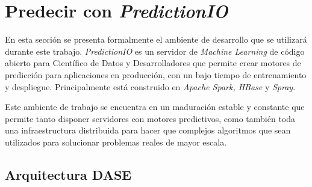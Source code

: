 

\section{Predecir con \emph{PredictionIO}}

  	
En esta sección se presenta formalmente el ambiente de desarrollo que se utilizará durante este trabajo. \emph{PredictionIO} es un servidor de \emph{Machine Learning} de código abierto para Científico de Datos y Desarrolladores que permite crear motores de predicción para aplicaciones en producción, con un bajo tiempo de entrenamiento y despliegue. Principalmente está construido en \emph{Apache Spark, HBase} y \emph{Spray}. 

Este ambiente de trabajo se encuentra en un maduración estable y constante que permite tanto disponer servidores con motores predictivos, como también toda una infraestructura distribuida para hacer que complejos algoritmos que sean utilizados para solucionar problemas reales de mayor escala.














 
 



\subsection{Arquitectura DASE}


